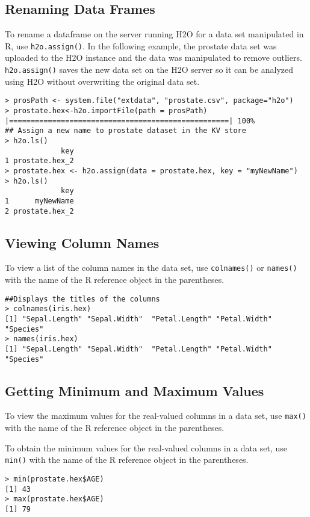 {{\subsection{Renaming Data Frames}

To rename a dataframe on the server running H2O for a data set manipulated in R, use {\texttt{h2o.assign()}}. In the following example, the prostate data set was uploaded to the H2O instance and the data was manipulated to remove outliers. {\texttt{h2o.assign()}} saves the new data set on the H2O server so it can be analyzed using H2O without overwriting the original data set.  

\newpage
\begin{lstlisting}[style=R]
> prosPath <- system.file("extdata", "prostate.csv", package="h2o")
> prostate.hex<-h2o.importFile(path = prosPath)
|===================================================| 100%
## Assign a new name to prostate dataset in the KV store
> h2o.ls()
             key
1 prostate.hex_2
> prostate.hex <- h2o.assign(data = prostate.hex, key = "myNewName")
> h2o.ls()
             key
1      myNewName
2 prostate.hex_2

\end{lstlisting}

\subsection{Viewing Column Names}

To view a list of the column names in the data set, use {\texttt{colnames()}} or {\texttt{names()}} with the name of the R reference object in the parentheses.

\begin{lstlisting}[style=R]
##Displays the titles of the columns
> colnames(iris.hex)
[1] "Sepal.Length" "Sepal.Width"  "Petal.Length" "Petal.Width"  "Species"     
> names(iris.hex)
[1] "Sepal.Length" "Sepal.Width"  "Petal.Length" "Petal.Width"  "Species"     
\end{lstlisting}


\subsection{Getting Minimum and Maximum Values}

To view the maximum values for the real-valued columns in a data set, use {\texttt{max()}} with the name of the R reference object in the parentheses.

To obtain the minimum values for the real-valued columns in a data set, use {\texttt{min()}} with the name of the R reference object in the parentheses.
\smallskip
\begin{lstlisting}[style=R]
> min(prostate.hex$AGE)
[1] 43
> max(prostate.hex$AGE)
[1] 79
\end{lstlisting}



}}

